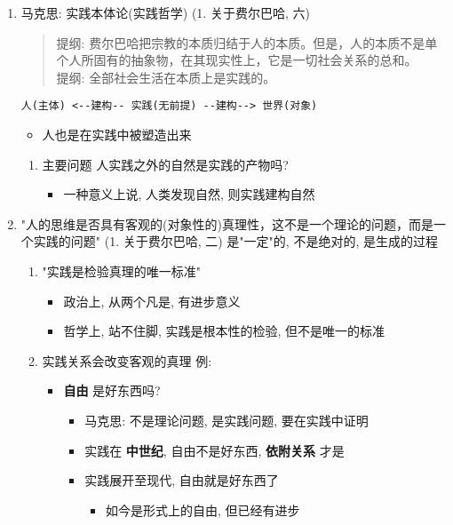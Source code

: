 \documentclass[11pt]{article}
\begin{document}
\begin{enumerate}
\begin{enumerate}
\item 马克思: 实践本体论(实践哲学) (1. 关于费尔巴哈, 六)
\label{sec:orgf4b7677}
\begin{quote}
提纲: 费尔巴哈把宗教的本质归结于人的本质。但是，人的本质不是单个人所固有的抽象物，在其现实性上，它是一切社会关系的总和。\\
提纲: 全部社会生活在本质上是实践的。
\end{quote}
\begin{verbatim}
人(主体) <--建构-- 实践(无前提) --建构--> 世界(对象)
\end{verbatim}
\begin{itemize}
\item 人也是在实践中被塑造出来
\end{itemize}
\begin{enumerate}
\item 主要问题
\label{sec:orgc4ba9f8}
人实践之外的自然是实践的产物吗?
\begin{itemize}
\item 一种意义上说, 人类发现自然, 则实践建构自然
\end{itemize}
\end{enumerate}
\item "人的思维是否具有客观的(对象性的)真理性，这不是一个理论的问题，而是一个实践的问题" (1. 关于费尔巴哈, 二)
\label{sec:org920857a}
是"一定"的, 不是绝对的, 是生成的过程
\begin{enumerate}
\item "实践是检验真理的唯一标准"
\label{sec:org9b06f93}
\begin{itemize}
\item 政治上, 从两个凡是, 有进步意义
\item 哲学上, 站不住脚, 实践是根本性的检验, 但不是唯一的标准
\end{itemize}
\item 实践关系会改变客观的真理
\label{sec:org07f2a28}
例:
\begin{itemize}
\item \textbf{自由} 是好东西吗?
\begin{itemize}
\item 马克思: 不是理论问题, 是实践问题, 要在实践中证明
\item 实践在 \textbf{中世纪}, 自由不是好东西, \textbf{依附关系} 才是
\item 实践展开至现代, 自由就是好东西了
\begin{itemize}
\item 如今是形式上的自由, 但已经有进步
\end{itemize}

\end{itemize}
\end{itemize}
\end{enumerate}
\end{enumerate}
\end{enumerate}
\end{document}

